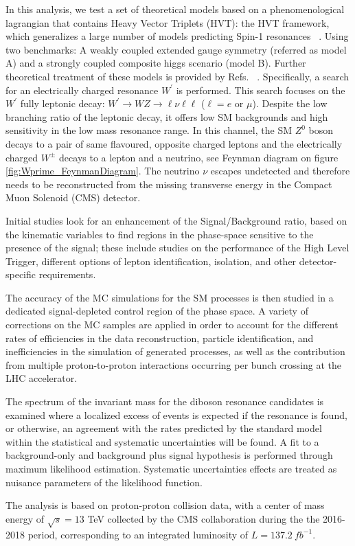 In this analysis, we test a set of theoretical models based on a phenomenological
lagrangian that contains Heavy Vector Triplets (HVT): the HVT framework, which
generalizes a large number of models predicting Spin-1 resonances ~\cite{hvt2014}.
Using two benchmarks: A weakly coupled extended gauge symmetry (referred as model A) and a
strongly coupled composite higgs scenario (model B). Further theoretical treatment of these models
is provided by Refs. ~\cite{hvt2014,modelA1980,modelB2011}. Specifically, a search
for an electrically charged resonance $W^{\prime}$ is performed. This search focuses
on the $W^{\prime}$ fully leptonic decay:
$W^{\prime}\rightarrow WZ \rightarrow \ell\nu \ell\ell$ ($\ell = e$ or $\mu$).
Despite the low branching ratio of the leptonic decay, it offers low SM backgrounds and high
sensitivity in the low mass resonance range. In this channel, the SM $Z^{0}$
boson decays to a pair of same flavoured, opposite charged leptons and the
electrically charged $W^{\pm}$ decays to a lepton and a neutrino, see Feynman diagram
on figure \ref{fig:Wprime_FeynmanDiagram}. The neutrino $\nu$ escapes
undetected and therefore needs to be reconstructed from the missing transverse
energy in the Compact Muon Solenoid (CMS) detector.

Initial studies look for an enhancement of the Signal/Background ratio,
based on the kinematic variables to find regions in the phase-space sensitive
to the presence of the signal; these include studies on the performance of
the High Level Trigger, different options of lepton identification, isolation,
and other detector-specific requirements.

The accuracy of the MC simulations for the SM processes is then studied in a
dedicated signal-depleted control region of the phase space. A variety of
corrections on the MC samples are applied in order to account for the different
rates of efficiencies in the data reconstruction, particle identification, and
inefficiencies in the simulation of generated processes, as well as the
contribution from multiple proton-to-proton interactions occurring per bunch
crossing at the LHC accelerator.

The spectrum of the invariant mass for the diboson resonance candidates is
examined where a localized excess of events is expected if the resonance is
found, or otherwise, an agreement with the rates predicted by the standard model
within the statistical and systematic uncertainties will be found.
A fit to a background-only and background plus signal hypothesis is performed
through maximum likelihood estimation. Systematic uncertainties effects are
treated as nuisance parameters of the likelihood function.

The analysis is based on proton-proton collision data, with a center of mass
energy of $\sqrt{s}=13$ TeV collected by the CMS collaboration during the the
2016-2018 period, corresponding to an integrated luminosity of $L=137.2~fb^{-1}$.
